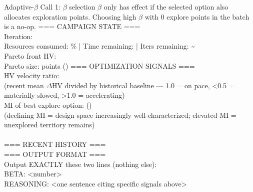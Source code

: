 \begin{fragmentbox}{Adaptive-$\beta$ Call 1: $\beta$ selection}
\vspace{0.35em}
$\beta$ only has effect if the selected option also allocates exploration points.
Choosing high $\beta$ with 0 explore points in the batch is a no-op.
\vspace{0.35em}
=== CAMPAIGN STATE ===\\
Iteration: \\
Resources consumed: \%  |  Time remaining:   |  Iters remaining: \~{}\\
Pareto front HV: \\
Pareto size:  points ()
\vspace{0.35em}
=== OPTIMIZATION SIGNALS ===\\
HV velocity ratio: \\
\hspace*{1em}(recent mean $\Delta$HV divided by historical baseline --- 1.0 = on pace, <0.5 = materially slowed, >1.0 = accelerating)\\
MI of best explore option:  ()\\
\hspace*{1em}(declining MI = design space increasingly well-characterized; elevated MI = unexplored territory remains)\\
\\
=== RECENT HISTORY ===\\
\vspace{0.35em}
=== OUTPUT FORMAT ===\\
Output EXACTLY these two lines (nothing else):\\
BETA: <number>\\
REASONING: <one sentence citing specific signals above>
\end{fragmentbox}

